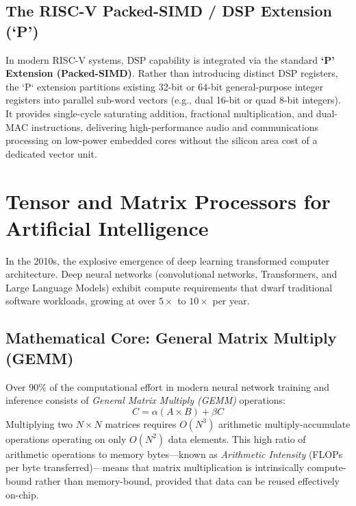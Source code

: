 \subsection{The RISC-V Packed-SIMD / DSP Extension (`P')}
In modern RISC-V systems, DSP capability is integrated via the standard \textbf{`P' Extension (Packed-SIMD)}. Rather than introducing distinct DSP registers, the `P` extension partitions existing 32-bit or 64-bit general-purpose integer registers into parallel sub-word vectors (e.g., dual 16-bit or quad 8-bit integers). It provides single-cycle saturating addition, fractional multiplication, and dual-MAC instructions, delivering high-performance audio and communications processing on low-power embedded cores without the silicon area cost of a dedicated vector unit.

\section{Tensor and Matrix Processors for Artificial Intelligence}\label{sec:tensor_matrix_processors}

In the 2010s, the explosive emergence of deep learning transformed computer architecture. Deep neural networks (convolutional networks, Transformers, and Large Language Models) exhibit compute requirements that dwarf traditional software workloads, growing at over $5\times$ to $10\times$ per year.

\subsection{Mathematical Core: General Matrix Multiply (GEMM)}
Over 90\% of the computational effort in modern neural network training and inference consists of \textit{General Matrix Multiply (GEMM)} operations:
\begin{equation}
C = \alpha (A \times B) + \beta C
\end{equation}
Multiplying two $N \times N$ matrices requires $O(N^3)$ arithmetic multiply-accumulate operations operating on only $O(N^2)$ data elements. This high ratio of arithmetic operations to memory bytes—known as \textit{Arithmetic Intensity} (FLOPs per byte transferred)—means that matrix multiplication is intrinsically compute-bound rather than memory-bound, provided that data can be reused effectively on-chip.

